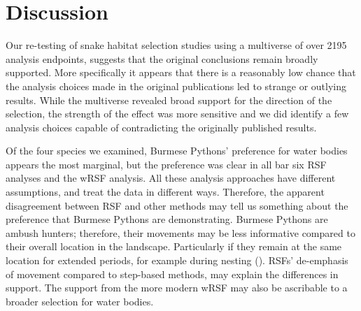 \documentclass[10pt,a4paper]{article}
\begin{document}
\section{Discussion}\label{discussion}

Our re-testing of snake habitat selection studies using a multiverse of over 2195 analysis endpoints, suggests that the original conclusions remain broadly supported.
More specifically it appears that there is a reasonably low chance that the analysis choices made in the original publications led to strange or outlying results.
While the multiverse revealed broad support for the direction of the selection, the strength of the effect was more sensitive and we did identify a few analysis choices capable of contradicting the originally published results.

Of the four species we examined, Burmese Pythons' preference for water bodies appears the most marginal, but the preference was clear in all bar six RSF analyses and the wRSF analysis.
All these analysis approaches have different assumptions, and treat the data in different ways.
Therefore, the apparent disagreement between RSF and other methods may tell us something about the preference that Burmese Pythons are demonstrating.
Burmese Pythons are ambush hunters; therefore, their movements may be less informative compared to their overall location in the landscape.
Particularly if they remain at the same location for extended periods, for example during nesting ().
RSFs' de-emphasis of movement compared to step-based methods, may explain the differences in support.
The support from the more modern wRSF may also be ascribable to a broader selection for water bodies.
\end{document}
